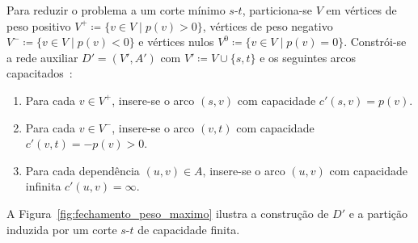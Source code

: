 Para reduzir o problema a um corte mínimo $s$-$t$, particiona-se $V$ em vértices de peso positivo $V^+ \coloneqq \{v \in V \mid p(v) > 0\}$, vértices de peso negativo $V^- \coloneqq \{v \in V \mid p(v) < 0\}$ e vértices nulos $V^0 \coloneqq \{v \in V \mid p(v) = 0\}$. Constrói-se a rede auxiliar $D' = (V', A')$ com $V' \coloneqq V \cup \{s, t\}$ e os seguintes arcos capacitados~\cite{picard1976maximal, ahuja1993network}:
\begin{enumerate}
    \item Para cada $v \in V^+$, insere-se o arco $(s, v)$ com capacidade $c'(s, v) = p(v)$.
    \item Para cada $v \in V^-$, insere-se o arco $(v, t)$ com capacidade $c'(v, t) = -p(v) > 0$.
    \item Para cada dependência $(u, v) \in A$, insere-se o arco $(u, v)$ com capacidade infinita $c'(u, v) = \infty$.
\end{enumerate}

A Figura~\ref{fig:fechamento_peso_maximo} ilustra a construção de $D'$ e a partição induzida por um corte $s$-$t$ de capacidade finita.

